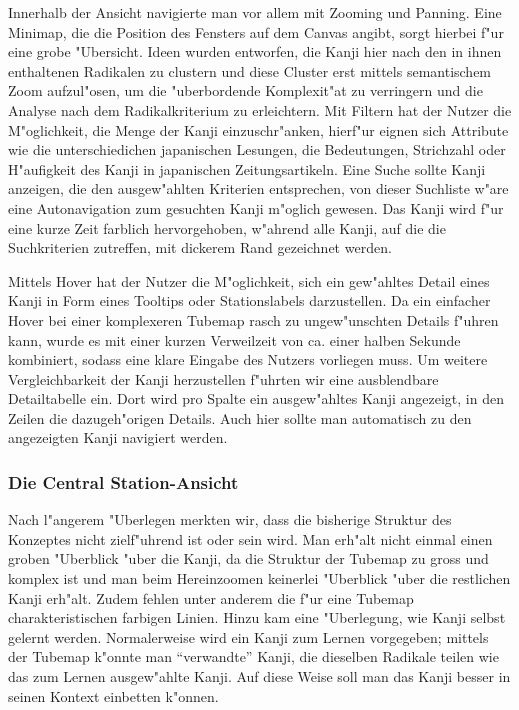 Innerhalb der Ansicht navigierte man vor allem mit Zooming und Panning. Eine Minimap, die die Position des Fensters auf dem Canvas angibt, sorgt hierbei f"ur eine grobe "Ubersicht. Ideen wurden entworfen, die Kanji hier nach den in ihnen enthaltenen Radikalen zu clustern und diese Cluster erst mittels semantischem Zoom aufzul"osen, um die "uberbordende Komplexit"at zu verringern und die Analyse nach dem Radikalkriterium zu erleichtern. Mit Filtern hat der Nutzer die M"oglichkeit, die Menge der Kanji einzuschr"anken, hierf"ur eignen sich Attribute wie die unterschiedichen japanischen Lesungen, die Bedeutungen, Strichzahl oder H"aufigkeit des Kanji in japanischen Zeitungsartikeln. Eine Suche sollte Kanji anzeigen, die den ausgew"ahlten Kriterien entsprechen, von dieser Suchliste w"are eine Autonavigation zum gesuchten Kanji m"oglich gewesen. Das Kanji wird f"ur eine kurze Zeit farblich hervorgehoben, w"ahrend alle Kanji, auf die die Suchkriterien zutreffen, mit dickerem Rand gezeichnet werden.

Mittels Hover hat der Nutzer die M"oglichkeit, sich ein gew"ahltes Detail eines Kanji in Form eines Tooltips oder Stationslabels darzustellen. Da ein einfacher Hover bei einer komplexeren Tubemap rasch zu ungew"unschten Details f"uhren kann, wurde es mit einer kurzen Verweilzeit von ca. einer halben Sekunde kombiniert, sodass eine klare Eingabe des Nutzers vorliegen muss. Um weitere Vergleichbarkeit der Kanji herzustellen f"uhrten wir eine ausblendbare Detailtabelle ein. Dort wird pro Spalte ein ausgew"ahltes Kanji angezeigt, in den Zeilen die dazugeh"origen Details. Auch hier sollte man automatisch zu den angezeigten Kanji navigiert werden. 


\subsubsection{Die Central Station-Ansicht}
Nach l"angerem "Uberlegen merkten wir, dass die bisherige Struktur des Konzeptes nicht zielf"uhrend ist oder sein wird. Man erh"alt nicht einmal einen groben "Uberblick "uber die Kanji, da die Struktur der Tubemap zu gross  und komplex ist und man beim Hereinzoomen keinerlei "Uberblick "uber die restlichen Kanji erh"alt. Zudem fehlen unter anderem die f"ur eine Tubemap charakteristischen farbigen Linien. Hinzu kam eine "Uberlegung, wie Kanji selbst gelernt werden. Normalerweise wird ein Kanji zum Lernen vorgegeben; mittels der Tubemap k"onnte man "`verwandte"' Kanji, die dieselben Radikale teilen wie das zum Lernen ausgew"ahlte Kanji. Auf diese Weise soll man das Kanji besser in seinen Kontext einbetten k"onnen.

